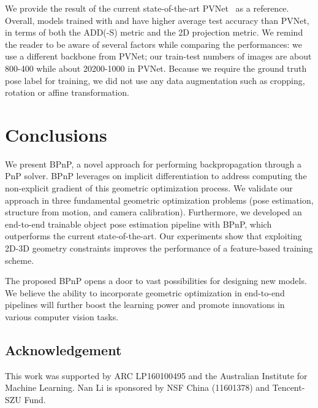 \documentclass[10pt,twocolumn,letterpaper]{article}
\begin{document}
We provide the result of the current state-of-the-art PVNet~\cite{Peng2019pvnet} as a reference. Overall, models trained with  and  have higher average test accuracy than PVNet, in terms of both the ADD(-S) metric and the 2D projection metric. We remind the reader to be aware of several factors while comparing the performances: we use a different backbone from PVNet; our train-test numbers of images are about 800-400 while about 20200-1000 in PVNet. Because we require the ground truth pose label for training, we did not use any data augmentation such as cropping, rotation or affine transformation. 






\section{Conclusions}


We present BPnP, a novel approach for performing backpropagation through a PnP solver. BPnP leverages on implicit differentiation to address computing the non-explicit gradient of this geometric optimization process. We validate our approach in three fundamental geometric optimization problems (pose estimation, structure from motion, and camera calibration). Furthermore, we developed an end-to-end trainable object pose estimation pipeline with BPnP, which outperforms the current state-of-the-art. Our experiments show that exploiting 2D-3D geometry constraints improves the performance of a feature-based training scheme.

The proposed BPnP opens a door to vast possibilities for designing new models. We believe the ability to incorporate geometric optimization in end-to-end pipelines will further boost the learning power and promote innovations in various computer vision tasks. 



\subsection*{Acknowledgement} This work was supported by ARC LP160100495 and the Australian Institute for Machine Learning. Nan Li is sponsored by NSF China (11601378) and Tencent-SZU Fund.



\clearpage

{\small


}
\end{document}
